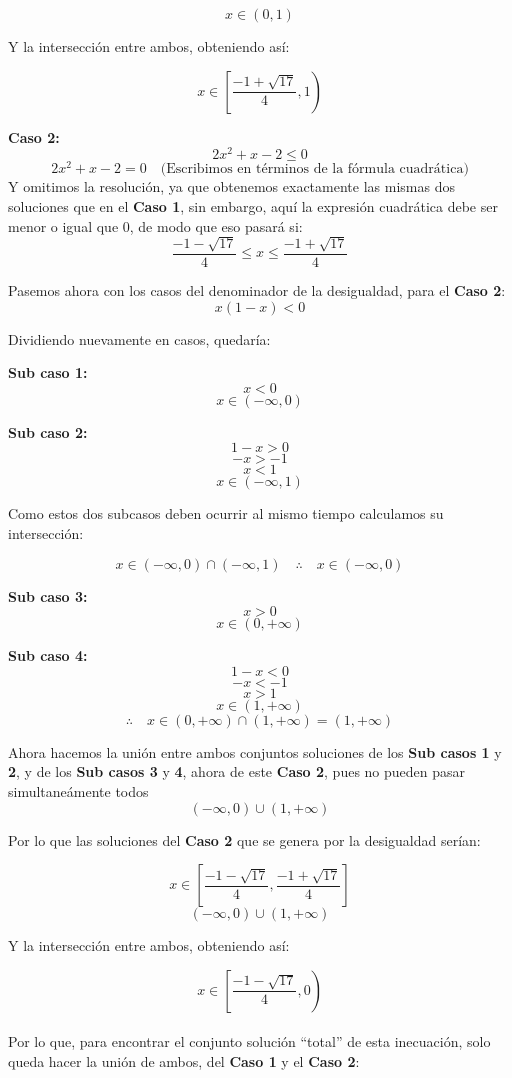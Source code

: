 \documentclass{article}
\begin{document}
\begin{enumerate}
\[
x \in (0,1)
\]

Y la intersección entre ambos, obteniendo así:

\[
x \in \left[\frac{-1 + \sqrt{17}}{4}, 1\right)
\]

\textbf{Caso 2:}
\[
2x^2 + x - 2 \leq 0
\]
\[
2x^2 + x - 2 = 0 \quad \text{(Escribimos en términos de la fórmula cuadrática)}
\]
Y omitimos la resolución, ya que obtenemos exactamente las mismas dos soluciones que en el \textbf{Caso 1}, sin embargo, aquí la expresión cuadrática debe ser menor o igual que 0, de modo que eso pasará si:
\[
\frac{-1 - \sqrt{17}}{4} \leq x \leq \frac{-1 + \sqrt{17}}{4}
\]

Pasemos ahora con los casos del denominador de la desigualdad, para el \textbf{Caso 2}:
\[
x(1-x) < 0
\]

Dividiendo nuevamente en casos, quedaría:

\textbf{Sub caso 1:}
\[
x < 0
\]
\[
x \in (-\infty, 0)
\]

\textbf{Sub caso 2:}
\[
1-x > 0
\]
\[
-x > -1
\]
\[
x < 1
\]
\[
x \in (-\infty, 1)
\]

Como estos dos subcasos deben ocurrir al mismo tiempo calculamos su intersección:

\[
x \in (-\infty, 0) \cap (-\infty, 1) \quad \therefore \quad x \in (-\infty, 0)
\]

\textbf{Sub caso 3:}
\[
x > 0
\]
\[
x \in (0, +\infty)
\]

\textbf{Sub caso 4:}
\[
1-x < 0
\]
\[
-x < -1
\]
\[
x > 1
\]
\[
x \in (1, +\infty)
\]
\[
\therefore \quad x \in (0, +\infty) \cap (1, +\infty) = (1, +\infty)
\]

Ahora hacemos la unión entre ambos conjuntos soluciones de los \textbf{Sub casos 1} y \textbf{2}, y de los \textbf{Sub casos 3} y \textbf{4}, ahora de este \textbf{Caso 2}, pues no pueden pasar simultaneámente todos
\[
(-\infty, 0) \cup (1, +\infty)
\]

Por lo que las soluciones del \textbf{Caso 2} que se genera por la desigualdad serían:

\[
x \in \left[ \frac{-1 - \sqrt{17}}{4}, \frac{-1 + \sqrt{17}}{4} \right]
\]
\[
(-\infty, 0) \cup (1, +\infty)
\]


Y la intersección entre ambos, obteniendo así:

\[
x \in \left[\frac{-1 - \sqrt{17}}{4}, 0\right)
\]\\

Por lo que, para encontrar el conjunto solución “total” de esta inecuación, solo queda hacer la unión de ambos, del \textbf{Caso 1} y el \textbf{Caso 2}:


\end{enumerate}
\end{document}
